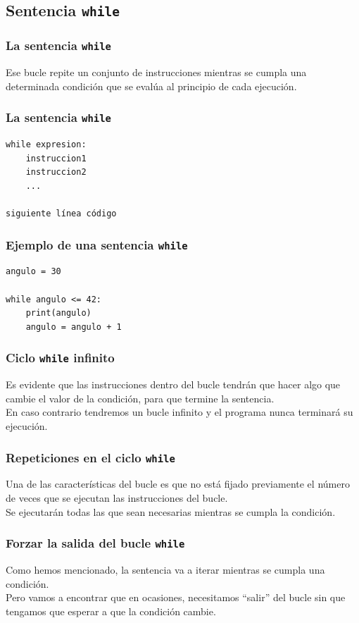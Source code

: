 \documentclass[12pt]{beamer}
\begin{document}
\subsection{Sentencia \texttt{while}}

\begin{frame}
\frametitle{La sentencia \texttt{while}}
Ese bucle repite un conjunto de instrucciones mientras se cumpla una determinada condición que se evalúa al principio de cada ejecución.
\end{frame}
\begin{frame}[fragile]
\frametitle{La sentencia \texttt{while}}
\fontsize{12}{12}\selectfont
\begin{verbatim}
while expresion:
    instruccion1
    instruccion2
    ...

siguiente línea código
\end{verbatim}
\end{frame}
\begin{frame}[fragile]
\frametitle{Ejemplo de una sentencia \texttt{while}}
\begin{lstlisting}[caption=Primer ejemplo de un ciclo while]
angulo = 30

while angulo <= 42:
    print(angulo)
    angulo = angulo + 1
\end{lstlisting}
\end{frame}
\begin{frame}
\frametitle{Ciclo \texttt{while} infinito}
Es evidente que las instrucciones dentro del bucle  tendrán que hacer algo que cambie el valor de la condición, para que termine la sentencia.
\\
\bigskip
En caso contrario tendremos un \textcolor{brickred}{bucle infinito} y el programa nunca terminará su ejecución.
\end{frame}
\begin{frame}
\frametitle{Repeticiones en el ciclo \texttt{while}}
Una de las características del bucle  es que no está fijado previamente el número de veces que se ejecutan las instrucciones del bucle.
\\
\bigskip
Se ejecutarán todas las que sean necesarias mientras se cumpla la condición.
\end{frame}
\begin{frame}
\frametitle{Forzar la salida del bucle \texttt{while}}
Como hemos mencionado, la sentencia  va a iterar mientras se cumpla una condición.
\\
\bigskip
Pero vamos a encontrar que en ocasiones, necesitamos \enquote{salir} del bucle sin que tengamos que esperar a que la condición cambie.
\end{frame}
\end{document}
